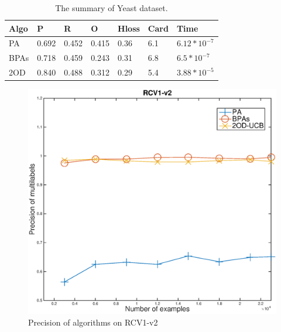 \begin{table}[h]
\caption{The summary of Yeast dataset.}
\label{table:yeast}
\begin{center}
\begin{tabular}{lllllll}
{\bf Algo}  & {\bf P} & {\bf R} & {\bf O}& {\bf Hloss} & {\bf Card} & {\bf Time}\\
\hline
PA & 0.692 & 0.452 & 0.415 & 0.36 & 6.1 & $6.12*10^{-7}$\\

BPAs & 0.718 & 0.459 & 0.243 & 0.31 & 6.8 & $6.5*10^{-7}$\\

2OD & 0.840 & 0.488 & 0.312 & 0.29 & 5.4 & $3.88*10^{-5}$\\
\end{tabular}
\end{center}
\end{table}
\begin{figure}[h!]
\vspace{.2in}
\centerline{
\includegraphics[scale = 0.6]{fig05/ml/precisionrcv1.eps}}
\caption{Precision of algorithms on RCV1-v2}
\label{pig:rcvPre}
\end{figure}

